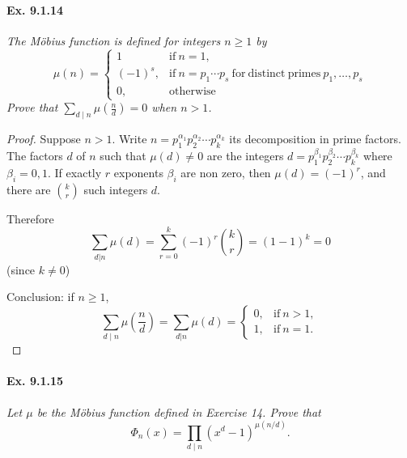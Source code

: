 \documentclass[11pt,a4paper]{article}
\begin{document}
\paragraph{Ex. 9.1.14}

{\it The M\"obius function is defined for integers $n\geq 1$ by
$$
\mu(n) = 
\left\{
\begin{array}{ll}
  1&    \mathrm{if} \ n=1,  \\
  (-1)^s,& \mathrm{if}\ n =p_1\cdots p_s\  \mathrm{for}\  \mathrm{distinct}\ \mathrm{primes}\ p_1, \ldots,p_s    \\
  0,    &   \mathrm{otherwise}
\end{array}
\right.
$$
Prove that $\sum_{d \mid n} \mu\left(\frac{n}{d}\right) = 0$ when $n>1$.
}

\begin{proof}
Suppose $n>1$.  Write $n =p_1^{\alpha_1} p_2^{\alpha_2}\cdots p_k^{\alpha_k}$ its decomposition in prime factors. The factors $d$ of $n$ such that $\mu(d) \ne 0$ are the integers $d = p_1^{\beta_1} p_2^{\beta_2}\cdots p_k^{\beta_k}$ where $\beta_i = 0,1$. If exactly $r$  exponents $\beta_i$ are non zero, then $\mu(d) = (-1)^r$, and there are  $\binom{k}{r}$ such integers $d$.
 
Therefore $$\sum_{d \vert n} \mu(d) = \sum_{r=0}^{k} (-1)^r \binom{k}{r} = (1-1)^k = 0 $$ (since $k \not = 0$)
 
  
 Conclusion: if $n \geq 1$,
 $$\sum_{d \mid n} \mu\left(\frac{n}{d}\right) = \sum_{d \vert n} \mu(d)= 
 \left\{
\begin{array}{ll}
  0,&    \mathrm{if} \ n>1,  \\
  1,   &   \mathrm{if}\ n=1.
\end{array}
\right.
$$
\end{proof}

\paragraph{Ex. 9.1.15}

{\it Let $\mu$ be the M\"obius function defined in Exercise 14. Prove that
$$\Phi_n(x) = \prod_{d\mid n} (x^d-1)^{\mu(n/d)}.$$
}
\end{document}
